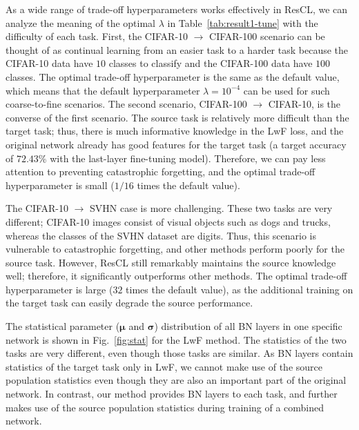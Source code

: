 \documentclass[letterpaper]{article}
\begin{document}
As a wide range of trade-off hyperparameters works effectively in ResCL, we can analyze the meaning of the optimal $\lambda$ in Table~\ref{tab:result1-tune} with the difficulty of each task. First, the CIFAR-10 $\rightarrow$ CIFAR-100 scenario can be thought of as continual learning from an easier task to a harder task because the CIFAR-10 data have $10$ classes to classify and the CIFAR-100 data have $100$ classes. The optimal trade-off hyperparameter is the same as the default value, which means that the default hyperparameter $\lambda = 10^{-4}$ can be used for such coarse-to-fine scenarios. The second scenario, CIFAR-100 $\rightarrow$ CIFAR-10, is the converse of the first scenario. The source task is relatively more difficult than the target task; thus, there is much informative knowledge in the LwF loss, and the original network already has good features for the target task (a target accuracy of $72.43$\% with the last-layer fine-tuning model). Therefore, we can pay less attention to preventing catastrophic forgetting, and the optimal trade-off hyperparameter is small ($1/16$ times the default value).

The CIFAR-10 $\rightarrow$ SVHN case is more challenging. These two tasks are very different; CIFAR-10 images consist of visual objects such as dogs and trucks, whereas the classes of the SVHN dataset are digits. Thus, this scenario is vulnerable to catastrophic forgetting, and other methods perform poorly for the source task. However, ResCL still remarkably maintains the source knowledge well; therefore, it significantly outperforms other methods. The optimal trade-off hyperparameter is large ($32$ times the default value), as the additional training on the target task can easily degrade the source performance.







The statistical parameter ($\bm{\mu}$ \textrm{and} $\bm{\sigma}$) distribution of all BN layers in one specific network is shown in Fig.~\ref{fig:stat} for the LwF method.
The statistics of the two tasks are very different, even though those tasks are similar.
As BN layers contain statistics of the target task only in LwF, we cannot make use of the source population statistics even though they are also an important part of the original network.
In contrast, our method provides BN layers to each task, and further makes use of the source population statistics during training of a combined network.
\end{document}
